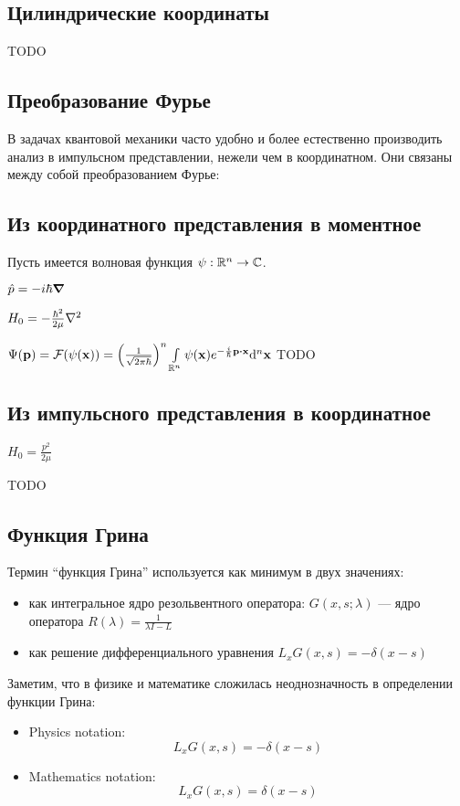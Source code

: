 \subsection{Цилиндрические координаты}
TODO

\subsection{Преобразование Фурье}
В задачах квантовой механики часто удобно и более естественно производить анализ в импульсном представлении, нежели чем в координатном. Они связаны между собой преобразованием Фурье:

\subsection{Из координатного представления в моментное}
Пусть имеется волновая функция $\psi: \mathbb{R}^n \to \mathbb{C}$. 

$\hat{p} = -i \hbar \grad$

$H_0 = - \frac{\hbar^2}{2 \mu} \laplacian$

$\Psi(\vb{p}) = \mcF(\psi(\vb{x})) = \left(\frac{1}{\sqrt{2 \pi \hbar}}\right)^n \int\limits_{\bbR^n} \psi(\vb{x}) e^{-\frac{i}{\hbar} \vb{p} \vdot \vb{x}} \dd^n \vb{x}$
TODO

\subsection{Из импульсного представления в координатное}

$H_0 = \frac{p^2}{2 \mu}$

TODO

\subsection{Функция Грина}
Термин ``функция Грина'' используется как минимум в двух значениях:

\begin{itemize}
\item как интегральное ядро резольвентного оператора: $G(x, s; \lambda)$ — ядро оператора $R(\lambda) = \frac{1}{\lambda I - L}$
\item как решение дифференциального уравнения $L_x G(x, s) = -\delta(x - s)$
\end{itemize}

Заметим, что в физике и математике сложилась неоднозначность в определении функции Грина:


\begin{itemize}
\item Physics notation: $$L_x G(x, s) = -\delta(x - s)$$
\item Mathematics notation: $$L_x G(x, s) = \delta(x - s)$$
\end{itemize} 


